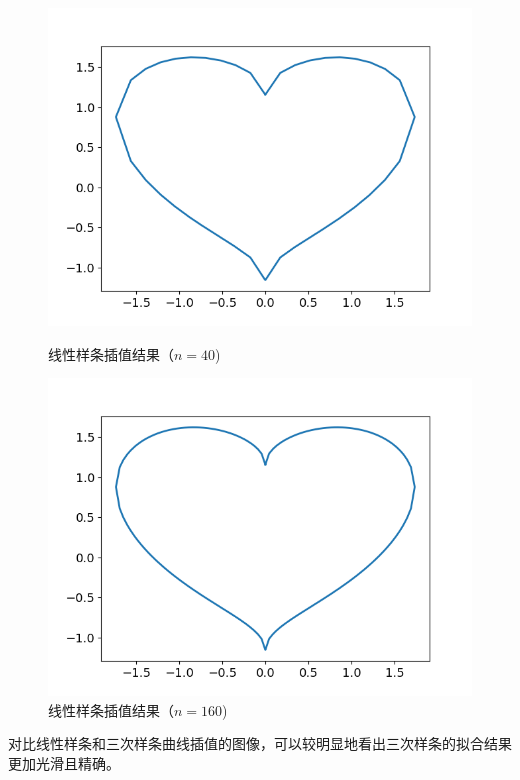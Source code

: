 \documentclass{ctexart}
\begin{document}
\begin{sloppypar}
\begin{figure}[H]
\begin{minipage}[t]{0.5\linewidth}
  \end{minipage}
  \label{fig12}
\end{figure}
\begin{figure}[H]
  \begin{minipage}[t]{0.5\linewidth}
    \centering
    \includegraphics[scale = 0.45]{fig//ProblemE_heartplot_40_linear.png}
    \caption{线性样条插值结果（$n=40$)}
  \end{minipage}
  \begin{minipage}[t]{0.5\linewidth}
    \centering
    \includegraphics[scale = 0.45]{fig//ProblemE_heartplot_160_linear.png}
    \caption{线性样条插值结果（$n=160$)}
  \end{minipage}
  \label{fig13}
\end{figure}
对比线性样条和三次样条曲线插值的图像，可以较明显地看出三次样条的拟合结果更加光滑且精确。
\end{sloppypar}
\end{document}
